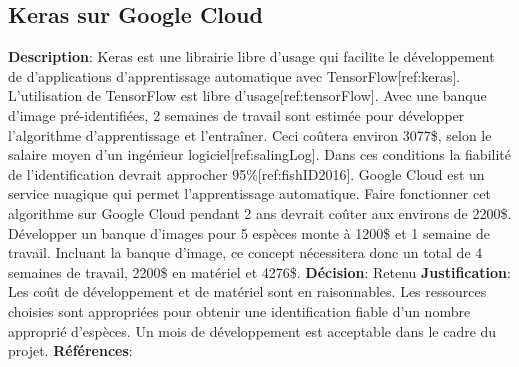 

\subsection{Keras sur Google Cloud}
\label{s:identifier_conc4}

\textbf{Description}: Keras est une librairie libre d’usage qui facilite le développement de d’applications d’apprentissage automatique avec TensorFlow[ref:keras].  L’utilisation de TensorFlow est libre d’usage[ref:tensorFlow]. Avec une banque d’image pré-identifiées, 2 semaines de travail sont estimée pour développer l'algorithme d’apprentissage et l’entraîner. Ceci coûtera environ 3077\$, selon le salaire moyen d’un ingénieur logiciel[ref:salingLog]. Dans ces conditions la fiabilité de l’identification devrait approcher 95\%[ref:fishID2016]. Google Cloud est un service nuagique qui permet l’apprentissage automatique. Faire fonctionner cet algorithme sur Google Cloud pendant 2 ans devrait coûter aux environs de 2200\$. Développer un banque d’images pour 5 espèces monte à 1200\$ et 1 semaine de travail. Incluant la banque d’image, ce concept nécessitera donc un total de 4 semaines de travail, 2200\$ en matériel et 4276\$.
\textbf{Décision}: Retenu
\textbf{Justification}: Les coût de développement et de matériel sont en raisonnables. Les ressources choisies sont appropriées pour obtenir une identification fiable d’un nombre approprié d’espèces. Un mois de développement est acceptable dans le cadre du projet.
\textbf{Références}: 
\cite{keras, googCloud, tensorFlow, fishID_2016, sal_ingLog}